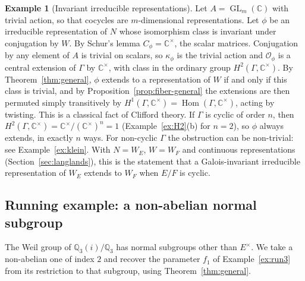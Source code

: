 \documentclass[12pt,letterpaper]{article}
\numberwithin{equation}{section}
\theoremstyle{plain}
\theoremstyle{definition}
\newtheorem{example}[theorem]{Example}
\newcommand{\C}{\mathbb{C}}
\newcommand{\Q}{\mathbb{Q}}
\DeclareMathOperator{\Hom}{Hom}
\DeclareMathOperator{\GL}{GL}
\begin{document}
\begin{example}[Invariant irreducible representations]\label{ex:clifford}
Let $A=\GL_m(\C)$ with trivial action, so that cocycles are
$m$-dimensional representations. Let $\phi$ be an irreducible
representation of $N$ whose isomorphism class is invariant under
conjugation by $W$. By Schur's lemma $C_\phi=\C^\times$, the scalar
matrices. Conjugation by any element of $A$ is trivial on scalars, so
$\kappa_\phi$ is the trivial action and $\mathcal{O}_\phi$ is a central
extension of $\Gamma$ by $\C^\times$, with class in the ordinary group
$H^2(\Gamma,\C^\times)$. By Theorem~\ref{thm:general}, $\phi$ extends to a
representation of $W$ if and only if this class is trivial, and by
Proposition~\ref{prop:fiber-general} the extensions are then permuted
simply transitively by $H^1(\Gamma,\C^\times)=\Hom(\Gamma,\C^\times)$,
acting by twisting. This is a classical fact of Clifford theory. If
$\Gamma$ is cyclic of order $n$, then
$H^2(\Gamma,\C^\times)=\C^\times/(\C^\times)^n=1$ (Example~\ref{ex:H2}(b)
for $n=2$), so $\phi$ always extends, in exactly $n$ ways. For
non-cyclic $\Gamma$ the obstruction can be non-trivial: see
Example~\ref{ex:klein}. With $N=W_E$, $W=W_F$ and continuous
representations (Section~\ref{sec:langlands}), this is the statement that
a Galois-invariant irreducible representation of $W_E$ extends to $W_F$
when $E/F$ is cyclic.
\end{example}

\subsection{Running example: a non-abelian normal subgroup}\label{ss:runH}

The Weil group of $\Q_3(i)/\Q_3$ has normal subgroups other than
$E^\times$. We take a non-abelian one of index $2$ and recover the
parameter $f_1$ of Example~\ref{ex:run3} from its restriction to that
subgroup, using Theorem~\ref{thm:general}.
\end{document}
